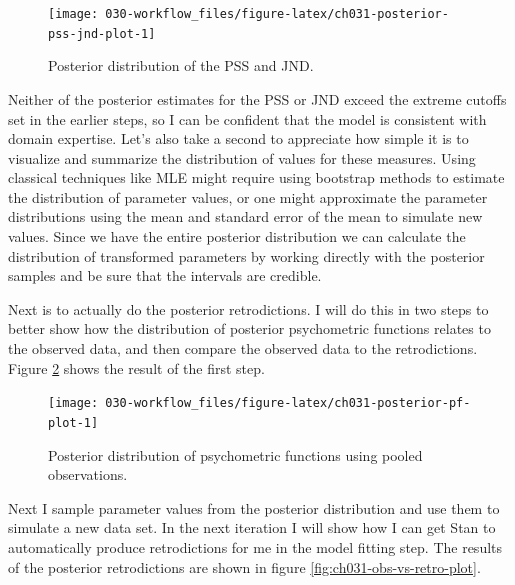 \documentclass[11pt, oneside, openany]{scrbook}
\begin{document}

\begin{figure}

{\centering \texttt{[image: 030-workflow\_files/figure-latex/ch031-posterior-pss-jnd-plot-1]} 

}

\caption{Posterior distribution of the PSS and JND.}\label{fig:ch031-posterior-pss-jnd-plot}
\end{figure}

Neither of the posterior estimates for the PSS or JND exceed the extreme cutoffs set in the earlier steps, so I can be confident that the model is consistent with domain expertise. Let's also take a second to appreciate how simple it is to visualize and summarize the distribution of values for these measures. Using classical techniques like MLE might require using bootstrap methods to estimate the distribution of parameter values, or one might approximate the parameter distributions using the mean and standard error of the mean to simulate new values. Since we have the entire posterior distribution we can calculate the distribution of transformed parameters by working directly with the posterior samples and be sure that the intervals are credible.

Next is to actually do the posterior retrodictions. I will do this in two steps to better show how the distribution of posterior psychometric functions relates to the observed data, and then compare the observed data to the retrodictions. Figure \ref{fig:ch031-posterior-pf-plot} shows the result of the first step.

\begin{figure}

{\centering \texttt{[image: 030-workflow\_files/figure-latex/ch031-posterior-pf-plot-1]} 

}

\caption{Posterior distribution of psychometric functions using pooled observations.}\label{fig:ch031-posterior-pf-plot}
\end{figure}

Next I sample parameter values from the posterior distribution and use them to simulate a new data set. In the next iteration I will show how I can get Stan to automatically produce retrodictions for me in the model fitting step. The results of the posterior retrodictions are shown in figure \ref{fig:ch031-obs-vs-retro-plot}.

\end{document}

